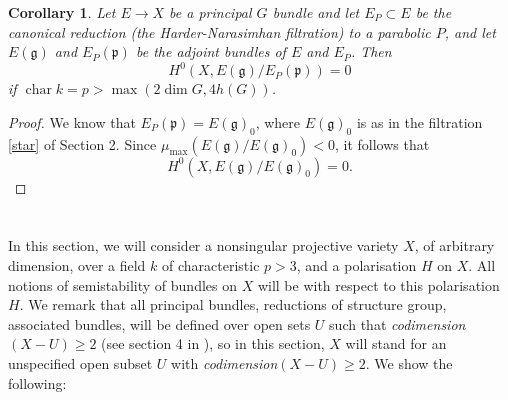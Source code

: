 \documentclass[12pt]{article}
\newtheorem{corollary}[proposition]{Corollary}
\begin{document}
\begin{corollary}\label{cor:3.6}
Let $E \to X$ be a principal $G$ bundle and let $E_P \subset E$ be the canonical reduction (the Harder-Narasimhan filtration) to a parabolic $P$, and let $E(\mathfrak{g})$ and $E_P(\mathfrak{p})$ be the adjoint bundles of $E$ and $E_P$. Then
\[
H^0(X, E(\mathfrak{g})/E_P(\mathfrak{p})) = 0
\]
if $\operatorname{char} k = p > \max(2 \dim G, 4h(G))$.
\end{corollary}
\begin{proof}
We know that $E_P(\mathfrak{p}) = E(\mathfrak{g})_0$, where $E(\mathfrak{g})_0$ is as in the filtration \eqref{star} of Section 2. Since $\mu_{\max}(E(\mathfrak{g})/E(\mathfrak{g})_0) < 0$, it follows that
\[
H^0(X, E(\mathfrak{g})/E(\mathfrak{g})_0) = 0.
\]
\end{proof}

\section{}
In this section, we will consider a nonsingular projective variety $X$, of arbitrary dimension, over a field $k$ of characteristic $p > 3$, and a polarisation $H$ on $X$. All notions of semistability of bundles on $X$ will be with respect to this polarisation $H$. We remark that all principal bundles, reductions of structure group, associated bundles, will be defined over open sets $U$ such that \emph{codimension}$(X - U) \geq 2$ (see section 4 in \cite{ramanan-ramanathan}), so in this section, $X$ will stand for an unspecified open subset $U$ with \emph{codimension}$(X - U) \geq 2$. We show the following:
\end{document}
